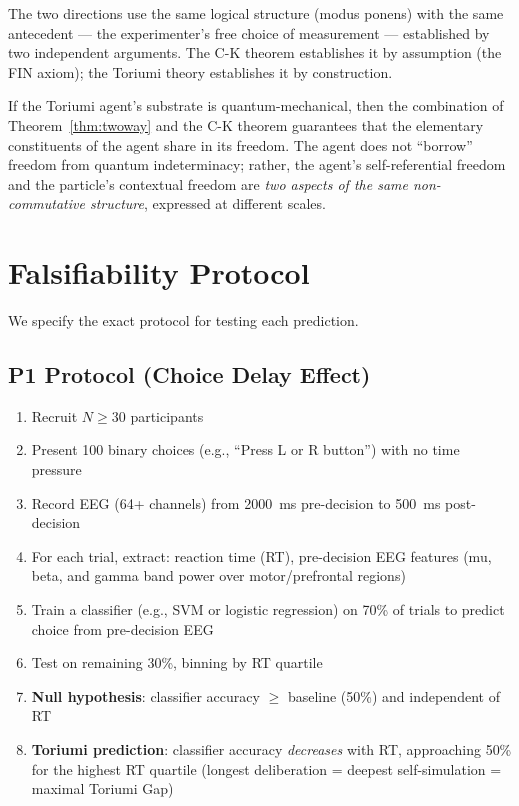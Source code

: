 \documentclass[12pt,a4paper]{article}
\theoremstyle{definition}
\theoremstyle{remark}
\begin{document}
The two directions use the same logical structure (modus ponens) with the
same antecedent --- the experimenter's free choice of measurement ---
established by two independent arguments. The C-K theorem establishes it by
assumption (the FIN axiom); the Toriumi theory establishes it by construction.

If the Toriumi agent's substrate is quantum-mechanical, then the combination
of Theorem~\ref{thm:twoway} and the C-K theorem guarantees that the elementary
constituents of the agent share in its freedom. The agent does not ``borrow''
freedom from quantum indeterminacy; rather, the agent's self-referential
freedom and the particle's contextual freedom are \emph{two aspects of the
same non-commutative structure}, expressed at different scales.

\section{Falsifiability Protocol}
\label{app:protocol}

We specify the exact protocol for testing each prediction.

\subsection*{P1 Protocol (Choice Delay Effect)}

\begin{enumerate}[itemsep=0pt]
\item Recruit $N \geq 30$ participants
\item Present 100 binary choices (e.g., ``Press L or R button'') with no
  time pressure
\item Record EEG (64+ channels) from 2000~ms pre-decision to 500~ms post-decision
\item For each trial, extract: reaction time (RT), pre-decision EEG features
  (mu, beta, and gamma band power over motor/prefrontal regions)
\item Train a classifier (e.g., SVM or logistic regression) on 70\% of trials
  to predict choice from pre-decision EEG
\item Test on remaining 30\%, binning by RT quartile
\item \textbf{Null hypothesis}: classifier accuracy $\geq$ baseline (50\%) and
  independent of RT
\item \textbf{Toriumi prediction}: classifier accuracy \emph{decreases} with
  RT, approaching 50\% for the highest RT quartile (longest deliberation =
  deepest self-simulation = maximal Toriumi Gap)
\end{enumerate}
\end{document}
